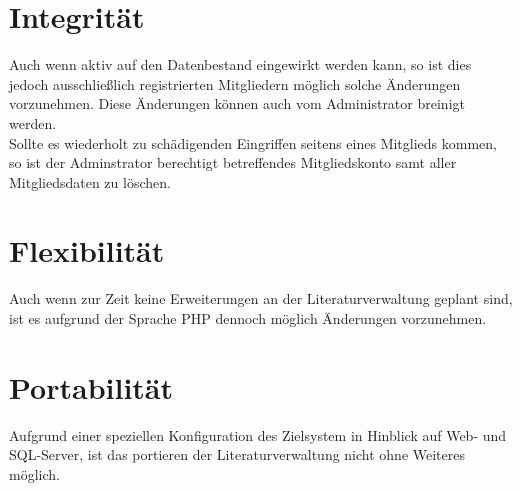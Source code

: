 \section{Integrität}
Auch wenn aktiv auf den Datenbestand eingewirkt werden kann, so ist dies jedoch ausschlie\ss lich registrierten Mitgliedern m\"oglich solche \"Anderungen vorzunehmen.
Diese \"Anderungen k\"onnen auch vom Administrator breinigt werden.\\
Sollte es wiederholt zu sch\"adigenden Eingriffen seitens eines Mitglieds kommen, so ist der Adminstrator berechtigt betreffendes Mitgliedskonto samt aller Mitgliedsdaten zu l\"oschen.
\section{Flexibilität}
Auch wenn zur Zeit keine Erweiterungen an der Literaturverwaltung geplant sind, ist es aufgrund der Sprache PHP dennoch m\"oglich \"Anderungen vorzunehmen.
\section{Portabilität}
Aufgrund einer speziellen Konfiguration des Zielsystem in Hinblick auf Web- und SQL-Server, ist das portieren der Literaturverwaltung nicht ohne Weiteres m\"oglich.